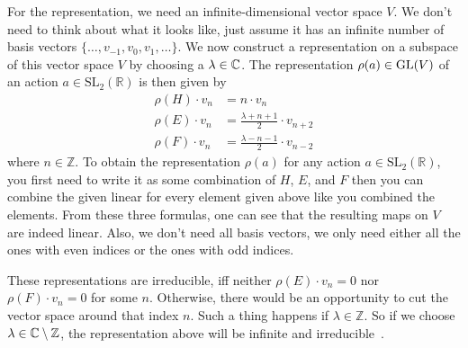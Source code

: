For the representation, we need an infinite-dimensional vector space $V$.
We don't need to think about what it looks like, just assume it has an infinite number of basis vectors $\{\ldots, v_{-1}, v_0, v_1, \ldots\}$.
We now construct a representation on a subspace of this vector space $V$ by choosing a $\lambda \in \mathbb{C}$.
The representation $\rho(a) \in \operatorname{GL}(V)$ of an action $a \in \text{SL}_2(\mathbb{R})$ is then given by
\begin{subequations}
    \begin{align}
        \rho(H) \cdot v_n & = n \cdot v_n \\
        \rho(E) \cdot v_n & = \frac{\lambda + n + 1}{2} \cdot v_{n + 2} \\
        \rho(F) \cdot v_n & = \frac{\lambda - n - 1}{2} \cdot v_{n - 2}
    \end{align}
\end{subequations}
where $n \in \mathbb{Z}$.
To obtain the representation $\rho(a)$ for any action $a \in \text{SL}_2(\mathbb{R})$, you first need to write it as some combination of $H$, $E$, and $F$ then you can combine the given linear for every element given above like you combined the elements.
From these three formulas, one can see that the resulting maps on $V$ are indeed linear.
Also, we don't need all basis vectors, we only need either all the ones with even indices or the ones with odd indices.

These representations are irreducible, iff neither $\rho(E) \cdot v_n = 0$ nor $\rho(F) \cdot v_n = 0$ for some $n$.
Otherwise, there would be an opportunity to cut the vector space around that index $n$.
Such a thing happens if $\lambda \in \mathbb{Z}$.
So if we choose $\lambda \in \mathbb{C} \setminus \mathbb{Z}$, the representation above will be infinite and irreducible~\cite{borcherds2011}.
